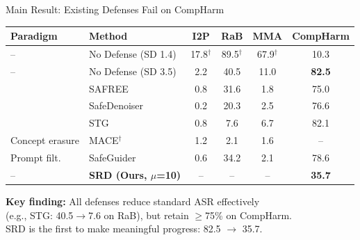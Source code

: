 \documentclass[aspectratio=169,12pt]{beamer}
\begin{document}
\begin{frame}{Main Result: Existing Defenses Fail on CompHarm}

\renewcommand{\arraystretch}{1.2}
\footnotesize
\begin{tabular}{@{} l l c c c c @{}}
\toprule
\textbf{Paradigm} & \textbf{Method} & \textbf{I2P} & \textbf{RaB} & \textbf{MMA} & \textbf{CompHarm} \\
\midrule
-- & No Defense (SD 1.4) & 17.8$^\dagger$ & 89.5$^\dagger$ & 67.9$^\dagger$ & 10.3 \\
-- & No Defense (SD 3.5) & 2.2  & 40.5 & 11.0 & \textcolor{dangerred}{\textbf{82.5}} \\
\midrule
{}
 & SAFREE  & 0.8  & 31.6 & 1.8  & \textcolor{dangerred}{75.0} \\
 & SafeDenoiser & 0.2  & 20.3 & 2.5  & \textcolor{dangerred}{76.6} \\
 & STG     & 0.8  & 7.6  & 6.7  & \textcolor{dangerred}{82.1} \\
\midrule
Concept erasure
 & MACE$^\dagger$  & 1.2  & 2.1  & 1.6  & -- \\
\midrule
Prompt filt. & SafeGuider & 0.6  & 34.2 & 2.1  & \textcolor{dangerred}{78.6} \\
\midrule
-- & \textbf{SRD (Ours, $\mu$=10)} & --   & --   & --   & \textcolor{accentblue}{\textbf{35.7}} \\
\bottomrule
\end{tabular}

\vspace{8pt}

\normalsize
\textbf{Key finding:} All defenses reduce standard ASR effectively\\
(e.g., STG: 40.5$\to$7.6 on RaB), but retain $\geq$75\% on CompHarm.\\
SRD is the first to make meaningful progress: 82.5 $\to$ 35.7.

\end{frame}
\end{document}
